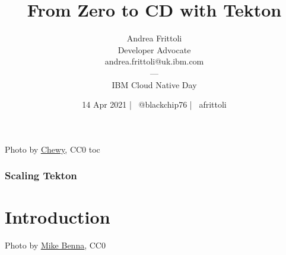 \documentclass[aspectratio=169,11pt,hyperref={colorlinks=true}]{beamer}
\title{From Zero to CD with Tekton}
\date[14 Apr 2021]{14 Apr 2021 | \faTwitter ~@blackchip76 | \faGithub ~afrittoli}
\author[Andrea Frittoli]{
  Andrea Frittoli \\
  Developer Advocate \\
  andrea.frittoli@uk.ibm.com \\
  --- \\
  IBM Cloud Native Day
}
\begin{document}
\begin{frame}
\titlepage{}
\end{frame}

\begin{lpicrblack}{%
  Photo by \href{https://unsplash.com/@chewy}{\underline{Chewy}}, CC0
  }%
  {%
  \tableofcontents
  }%
  {toc}
  \frametitle{Scaling Tekton}
\end{lpicrblack}

\section[Introduction]{Introduction}

\begin{sectionwithpic}{Photo by \href{https://unsplash.com/@mbenna}{\underline{Mike Benna}}, CC0}
\end{sectionwithpic}
\end{document}
